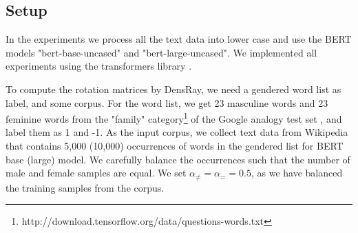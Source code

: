 \subsection{Setup}
In the experiments we process all the text data into lower case and use the BERT models "bert-base-uncased" and "bert-large-uncased". We implemented all experiments using the transformers library \citep{wolf2019huggingfaces}.

To compute the rotation matrices by DensRay, we need a gendered word list as label, and some corpus. For the word list, we get 23 masculine words and 23 feminine words from the "family" category\footnote{http://download.tensorflow.org/data/questions-words.txt} of the Google analogy test set \citep{mikolov2013efficient}, and label them as 1 and -1. As the input corpus, we collect text data from Wikipedia that contains 5,000 (10,000) occurrences of words in the gendered list for BERT base (large) model. We carefully balance the occurrences such that the number of male and female samples are equal. We set  $\alpha_{\neq}=\alpha_{=}=0.5$, as we have balanced the training samples from the corpus.

